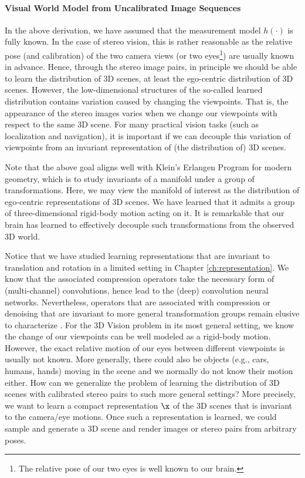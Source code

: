 \documentclass[../../book-main.tex]{subfiles}
\begin{document}
\paragraph{Visual World Model from Uncalibrated Image Sequences}

In the above derivation, we have assumed that the measurement model $h(\cdot)$ is fully known. In the case of stereo vision, this is rather reasonable as the relative pose (and calibration) of the two camera views (or two eyes\footnote{The relative pose of our two eyes is well known to our brain.}) are usually known in advance. Hence, through the stereo image pairs, in principle we should be able to learn the distribution of 3D scenes, at least the ego-centric distribution of 3D scenes. However, the low-dimensional structures of the so-called learned distribution contains variation caused by changing the viewpoints. That is, the appearance of the stereo images varies when we change our viewpoints with respect to the same 3D scene. For many practical vision tasks (such as localization and navigation), it is important if we can decouple this variation of viewpoints from an invariant representation of (the distribution of) 3D scenes.

\begin{remark}Note that the above goal aligns well with Klein's Erlangen Program for modern geometry, which is to study invariants of a manifold under a group of transformations. Here, we may view the manifold of interest as the distribution of ego-centric representations of 3D scenes. We have learned that it admits a group of three-dimensional rigid-body motion acting on it. It is remarkable that our brain has learned to effectively decouple such transformations from the observed 3D world.
\end{remark}


Notice that we have studied learning representations that are invariant to translation and rotation in a limited setting in Chapter \ref{ch:representation}. We know that the associated compression operators take the necessary form of (multi-channel) convolutions, hence lead to the (deep) convolution neural networks. Nevertheless, operators that are associated with compression or denoising that are invariant to more general transformation groups remain elusive to characterize \cite{eqvivariant-DNN}.  
For the 3D Vision problem in its most general setting, we know the change of our viewpoints can be well modeled as a rigid-body motion. However, the exact relative motion of our eyes between different viewpoints is usually not known. More generally, there could also be objects (e.g., cars, humans, hands) moving in the scene and we normally do not know their motion either. How can we generalize the problem of learning the distribution of 3D scenes with calibrated stereo pairs to such more general settings? More precisely, we want to learn a compact representation $\x$ of the 3D scenes that is invariant to the camera/eye motions. Once such a representation is learned, we could sample and generate a 3D scene and render images or stereo pairs from arbitrary poses. 
\end{document}
